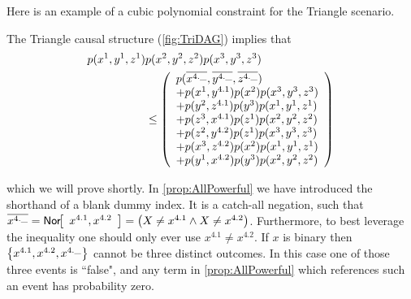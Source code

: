Here is an example of a cubic polynomial constraint for the Triangle scenario. 
\begin{prop} \label{prop:AllPowerful}
The Triangle causal structure (\cref{fig:TriDAG}) implies that
\begin{align*}\begin{split}
p\lparen{x}_{}^{1} , {y}_{}^{1} , {z}_{}^{1}\rparen&p\lparen{x}_{}^{2} , {y}_{}^{2} , {z}_{}^{2}\rparen p\lparen{x}_{}^{3} , {y}_{}^{3} , {z}_{}^{3}\rparen
\\&\leq\left\lparen\begin{array}{l}
    p\lparen \overline{x^{4.\_}} , \overline{y^{4.\_}} , \overline{z^{4.\_}} \rparen
\\ +p\lparen {x^{1}} , {y^{4.1}} \rparen p\lparen{x^{2}} \rparen p\lparen {x^{3}} , {y^{3}} , {z^{3}} \rparen
\\ +p\lparen {y^{2}} , {z^{4.1}} \rparen p\lparen{y^{3}} \rparen p\lparen {x^{1}} , {y^{1}} , {z^{1}} \rparen
\\ +p\lparen {z^{3}} , {x^{4.1}} \rparen p\lparen{z^{1}} \rparen p\lparen {x^{2}} , {y^{2}} , {z^{2}} \rparen
\\ +p\lparen {z^{2}} , {y^{4.2}} \rparen p\lparen{z^{1}} \rparen p\lparen {x^{3}} , {y^{3}} , {z^{3}} \rparen
\\ +p\lparen {x^{3}} , {z^{4.2}} \rparen p\lparen{x^{2}} \rparen p\lparen {x^{1}} , {y^{1}} , {z^{1}} \rparen
\\ +p\lparen {y^{1}} , {x^{4.2}} \rparen p\lparen{y^{3}} \rparen p\lparen {x^{2}} , {y^{2}} , {z^{2}} \rparen
   \end{array}\right\rparen
\end{split}\end{align*}
\end{prop}
\noindent which we will prove shortly.
In \cref{prop:AllPowerful} we have introduced the shorthand of a blank dummy index. It is a catch-all negation, such that $\n{{x}_{}^{4.\_}}=\NamedFunction{Nor}{{x}_{}^{4.1},{x}_{}^{4.2}}=\parens*{X\neq x^{4.1}\land X\neq x^{4.2}}$. Furthermore, to best leverage the inequality one should only ever use $x^{4.1}\neq x^{4.2}$. If $x$ is binary then $\left\lbrace x^{4.1},x^{4.2},x^{4.\_}\right\rbrace$ cannot be three distinct outcomes. In this case one of those three events is ``false", and any term in \cref{prop:AllPowerful} which references such an event has probability zero.
